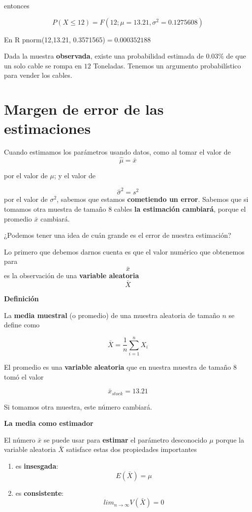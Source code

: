 \documentclass[
]{book}
\providecommand{\tightlist}{%
  \setlength{\itemsep}{0pt}\setlength{\parskip}{0pt}}
\begin{document}
entonces

\[P(X \leq 12)= F(12; \mu=13.21, \sigma^2=0.1275608)\]

En R pnorm(12,13.21, 0.3571565)\(=0.000352188\)

Dada la muestra \textbf{observada}, existe una probabilidad estimada de \(0.03\%\) de que un solo cable se rompa en \(12\) Toneladas. Tenemos un argumento probabilístico para vender los cables.

\hypertarget{margen-de-error-de-las-estimaciones}{%
\section{Margen de error de las estimaciones}\label{margen-de-error-de-las-estimaciones}}

Cuando estimamos los parámetros usando datos, como al tomar el valor de \[\hat{\mu}=\bar{x}\]

por el valor de \(\mu\); y el valor de

\[\hat{\sigma}^2=s^2\]
por el valor de \(\sigma^2\), sabemos que estamos \textbf{cometiendo un error}. Sabemos que si tomamos otra muestra de tamaño \(8\) cables \textbf{la estimación cambiará}, porque el promedio \(\bar{x}\) cambiará.

¿Podemos tener una idea de cuán grande es el error de nuestra estimación?

Lo primero que debemos darnos cuenta es que el valor numérico que obtenemos para \[\bar{x}\] es la observación de una \textbf{variable aleatoria} \[\bar{X}\]

\textbf{Definición}

La \textbf{media muestral} (o promedio) de una muestra aleatoria de tamaño \(n\) se define como

\[\bar{X}=\frac{1}{n}\sum_{i=1}^n X_i\]

El promedio es una \textbf{variable aleatoria} que en nuestra muestra de tamaño \(8\) tomó el valor

\[\bar{x}_{stock}=13.21\]

Si tomamos otra muestra, este número cambiará.

\textbf{La media como estimador}

El número \(\bar{x}\) se puede usar para \textbf{estimar} el parámetro desconocido \(\mu\) porque la variable aleatoria \(\bar{X}\) satisface estas dos propiedades importantes

\begin{enumerate}
\def\labelenumi{\arabic{enumi})}
\tightlist
\item
  es \textbf{insesgada}: \[E(\bar{X})=\mu\]
\item
  es \textbf{consistente}: \[lim_{n \rightarrow \infty} V(\bar{X}) = 0\]
\end{enumerate}
\end{document}
